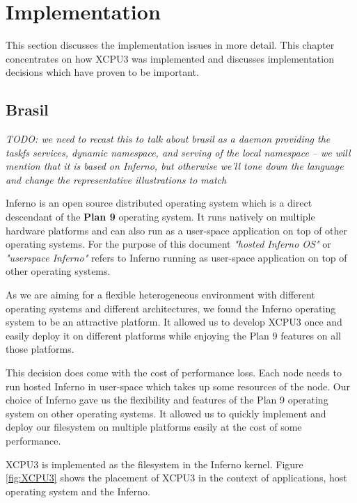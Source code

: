 \section{Implementation}

This section discusses the implementation issues in more detail.  This chapter
concentrates on how XCPU3 was implemented and discusses implementation
decisions which have proven to be important.

\subsection{Brasil}
\emph{TODO: we need to recast this to talk about brasil as a daemon providing
the taskfs services, dynamic namespace, and serving of the local namespace --
we will mention that it is based on Inferno, but otherwise we'll tone down
the language and change the representative illustrations to match}

Inferno\cite{inferno} is an open source distributed operating system which is a 
direct descendant of the \textbf{Plan 9} operating system.  It runs natively on
multiple hardware platforms and can also run as a user-space application on
top of other operating systems.  For the purpose of this document
\textit{"hosted Inferno OS"} or \textit{"userspace Inferno"} refers to Inferno
running as user-space application on top of other operating systems.

As we are aiming for a flexible heterogeneous environment with different
operating systems and different architectures, we found the Inferno operating
system to be an attractive platform.  It allowed us to develop XCPU3 once and
easily deploy it on different platforms while enjoying the Plan 9 features
on all those platforms.

This decision does come with the cost of performance loss.  Each node needs
to run hosted Inferno in user-space which takes up some resources of the node. 
Our choice of Inferno gave us the flexibility and features of the Plan 9
operating system on other operating systems.  It allowed us to quickly
implement and deploy our filesystem on multiple platforms easily at the cost
of some performance.

XCPU3 is implemented as the filesystem in the Inferno kernel.  Figure 
\ref{fig:XCPU3} shows the placement of XCPU3 in the context of applications,
host operating system and the Inferno.


